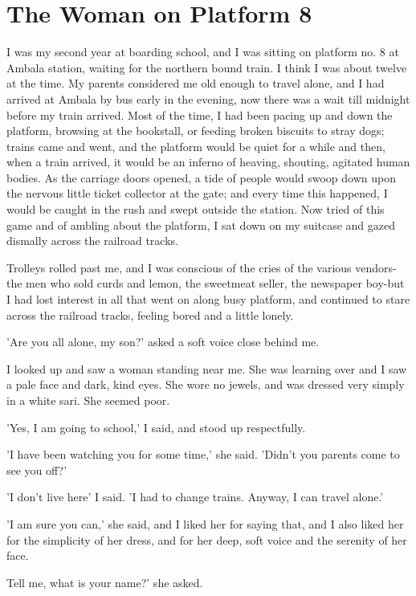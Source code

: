 \chapter{The Woman on Platform 8}
I was my second year at boarding school, and I was sitting on platform no. 8 at Ambala station, waiting for the northern bound train. I think I was about twelve at the time. My parents considered me old enough to travel alone, and I had arrived at Ambala by bus early in the evening, now there was a wait till midnight before my train arrived. Most of the time, I had been pacing up and down the platform, browsing at the bookstall, or feeding broken biscuits to stray dogs; trains came and went, and the platform would be quiet for a while and then, when a train arrived, it would be an inferno of heaving, shouting, agitated human bodies. As the carriage doors opened, a tide of people would swoop down upon the nervous little ticket collector at the gate; and every time this happened, I would be caught in the rush and swept outside the station. Now tried of this game and of ambling about the platform, I sat down on my suitcase and gazed dismally across the railroad tracks.
\par
Trolleys rolled past me, and I was conscious of the cries of the various vendors-the men who sold curds and lemon, the sweetmeat seller, the newspaper boy-but I had lost interest in all that went on along busy platform, and continued to stare across the railroad tracks, feeling bored and a little lonely.
\par
'Are you all alone, my son?' asked a soft voice close behind me.
\par
I looked up and saw a woman standing near me. She was learning over and I saw a pale face and dark, kind eyes. She wore no jewels, and was dressed very simply in a white sari. She seemed poor.
\par
'Yes, I am going to school,' I said, and stood up respectfully.
\par
'I have been watching you for some time,' she said. 'Didn't you parents come to see you off?'
\par
'I don't live here' I said. 'I had to change trains. Anyway, I can travel alone.'
\par
'I am sure you can,' she said, and I liked her for saying that, and I also liked her for the simplicity of her dress, and for her deep, soft voice and the serenity of her face.
\par
Tell me, what is your name?' she asked.
\par
